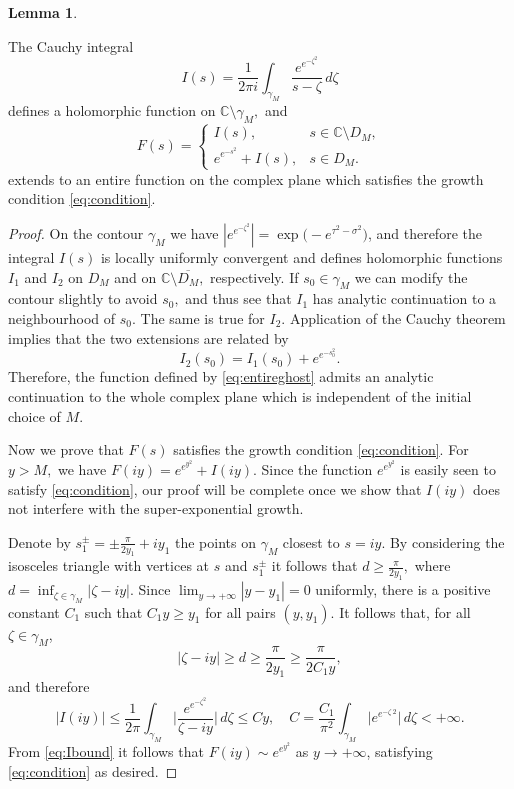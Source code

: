 \documentclass[12pt]{article}
\theoremstyle{definition}
\newtheorem{lemma}[theorem]{Lemma}
\begin{document}
\begin{lemma}\label{lem:ghostconstruction}

The Cauchy integral \begin{equation*}\label{eq:cauchyint}
I(s)= \frac{1}{2 \pi i}\int_{\gamma_M}\frac{e^{e^{- \zeta^2}}}{s-\zeta} \,d\zeta
\end{equation*} defines a holomorphic function on $\mathbb{C}\setminus \gamma_M,$ and 
\begin{equation}\label{eq:entireghost}
F(s)=
\begin{cases}
I(s), & s\in\mathbb{C}\setminus D_M,\\
e^{e^{-s^2}}+I(s), & s\in D_M.
\end{cases}
\end{equation} extends to an entire function on the complex plane which satisfies the growth condition \eqref{eq:condition}.
    
\end{lemma}

\begin{proof}
    On the contour $\gamma_M$ we have \(\left|e^{e^{-\zeta^2}}\right|
=
\exp\!\big(-e^{\tau^2-\sigma^2}\big) \), and therefore the integral $I(s)$ is locally uniformly convergent and defines holomorphic functions $I_1$ and $I_2$ on $D_M$ and on $\mathbb{C}\setminus \overline{D_M},$ respectively. If $s_0 \in \gamma_M$ we can modify the contour slightly to avoid $s_0,$ and thus see that $I_1$ has analytic continuation to a neighbourhood of $s_0.$ The same is true for $I_2.$
Application of the Cauchy theorem implies that the two extensions are related by
\[
I_2(s_0)= I_1(s_0)+e^{e^{-s_0^2}}.
\]
Therefore, the function defined by \eqref{eq:entireghost} admits an analytic continuation to the whole complex plane which is independent of the initial choice of $M.$ 

Now we prove that $F(s)$ satisfies the growth condition \eqref{eq:condition}. For $y>M,$ we have \(F(iy)=e^{e^{y^2}}+I(iy).\) Since the function $e^{e^{y^2}}$ is easily seen to satisfy \eqref{eq:condition}, our proof will be complete once we show that $I(iy)$ does not interfere with the super-exponential growth.

Denote by $s_1^{\pm}= \pm \frac{\pi}{2 y_1}+iy_1$ the points on $\gamma_M$ closest to $s=iy.$ By considering the isosceles triangle with vertices at $s$ and $s_1^{\pm}$ it follows that $d \geq \frac{\pi}{2y_1},$ where \(d= \inf_{\zeta \in \gamma_M} |\zeta-iy|.\) Since \( \lim_{y \to + \infty} |y-y_1|=0\) uniformly, there is a positive constant $C_1$ such that $C_1 y \geq y_1$ for all pairs \((y,y_1).\) It follows that,  for all $\zeta \in \gamma_M$, 
    \[ |\zeta- iy| \geq d \geq \frac{\pi}{2y_1} \geq \frac{\pi}{2C_1y},\] 
    and therefore
    \begin{equation}\label{eq:Ibound}
        |I(iy)| \leq \frac{1}{2 \pi}\int_{\gamma_M}\Bigg |\frac{e^{e^{-\zeta^2}}}{\zeta-iy}\Bigg | \,d\zeta \leq Cy, \quad C= \frac{C_1}{\pi^2}\int_{\gamma_M} \bigg | e^{e^{-\zeta~2}} \bigg| \,d\zeta< + \infty. 
    \end{equation}
    From \eqref{eq:Ibound} it follows that \(F(iy) \sim e^{e^{y^2}} \) as $y \to + \infty$, satisfying \eqref{eq:condition} as desired.
\end{proof}
\end{document}
